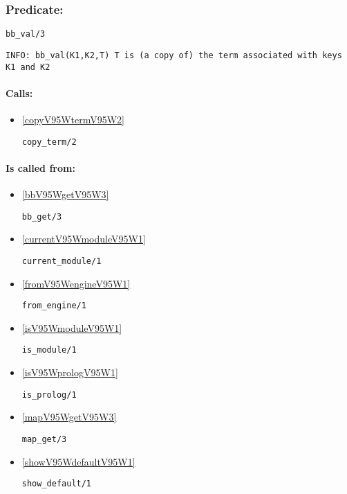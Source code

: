 \subsubsection{Predicate:} \label{bbV95WvalV95W3}

\begin{verbatim}
bb_val/3
\end{verbatim}

{\small \begin{verbatim}
INFO: bb_val(K1,K2,T) T is (a copy of) the term associated with keys K1 and K2

\end{verbatim}}
\paragraph{Calls:} 
\begin{itemize}
\item \ref{copyV95WtermV95W2} 
\begin{verbatim}
copy_term/2
\end{verbatim}

\end{itemize}
\paragraph{Is called from:} 
\begin{itemize}
\item \ref{bbV95WgetV95W3} 
\begin{verbatim}
bb_get/3
\end{verbatim}

\item \ref{currentV95WmoduleV95W1} 
\begin{verbatim}
current_module/1
\end{verbatim}

\item \ref{fromV95WengineV95W1} 
\begin{verbatim}
from_engine/1
\end{verbatim}

\item \ref{isV95WmoduleV95W1} 
\begin{verbatim}
is_module/1
\end{verbatim}

\item \ref{isV95WprologV95W1} 
\begin{verbatim}
is_prolog/1
\end{verbatim}

\item \ref{mapV95WgetV95W3} 
\begin{verbatim}
map_get/3
\end{verbatim}

\item \ref{showV95WdefaultV95W1} 
\begin{verbatim}
show_default/1
\end{verbatim}

\end{itemize}

